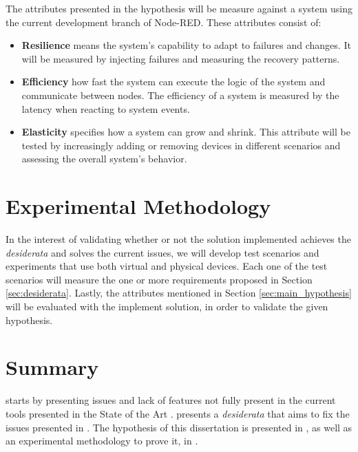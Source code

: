 The attributes presented in the hypothesis will be measure against a system using the current development branch of Node-RED. These attributes consist of:

\begin{itemize}
    \item \textbf{Resilience} means the system's capability to adapt to failures and changes. It will be measured by injecting failures and measuring the recovery patterns.
    \item \textbf{Efficiency} how fast the system can execute the logic of the system and communicate between nodes. The efficiency of a system is measured by the latency when reacting to system events. 
    \item \textbf{Elasticity} specifies how a system can grow and shrink. This attribute will be tested by increasingly adding or removing devices in different scenarios and assessing the overall system's behavior.
\end{itemize}

\section{Experimental Methodology}\label{sec:exp_meth}

In the interest of validating whether or not the solution implemented achieves the \emph{desiderata} and solves the current issues, we will develop test scenarios and experiments that use both virtual and physical devices. Each one of the test scenarios will measure the one or more requirements proposed in Section \ref{sec:desiderata}. Lastly, the attributes mentioned in Section \ref{sec:main_hypothesis} will be evaluated with the implement solution, in order to validate the given hypothesis.

\section{Summary}\label{sec:stat_summary}

 starts by presenting issues and lack of features not fully present in the current tools presented in the State of the Art .  presents a \textit{desiderata} that aims to fix the issues presented in . The hypothesis of this dissertation is presented in , as well as an experimental methodology to prove it, in .

